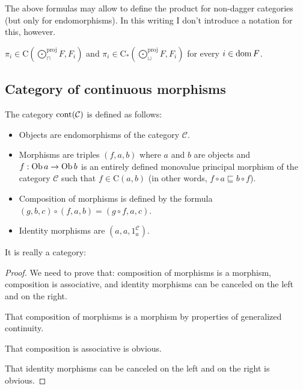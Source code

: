 \begin{rem}
  The above formulas may allow to define the product for non-dagger categories
  (but only for endomorphisms). In this writing I don't introduce a notation
  for this, however.
\end{rem}

\begin{cor}
  $\pi_i \in \mathrm{C} \left( \bigodot^{\text{proj}}_{\sqcap} F , F_i \right)$ and
  $\pi_i \in \mathrm{C}_{\ast} \left( \bigodot^{\text{proj}}_{\sqcup} F , F_i \right)$
  for every $i \in \operatorname{dom} F$.
\end{cor}

\subsection{Category of continuous morphisms}

\begin{defn}
  The category $\operatorname{cont} (\mathcal{C})$ is defined as follows:
  \begin{itemize}
    \item Objects are endomorphisms of the category $\mathcal{C}$.
    
    \item Morphisms are triples $(f , a , b)$ where $a$ and $b$ are objects
    and $f : \operatorname{Ob} a \rightarrow \operatorname{Ob} b$ is an entirely defined
    monovalue principal morphism of the category $\mathcal{C}$ such that $f
    \in \mathrm{C} (a , b)$ (in other words, $f \circ a \sqsubseteq b \circ
    f$).
    
    \item Composition of morphisms is defined by the formula $(g , b , c)
    \circ (f , a , b) = (g \circ f , a , c)$.
    
    \item Identity morphisms are $(a , a , 1^{\mathcal{C}}_a)$.
  \end{itemize}
\end{defn}

It is really a category:

\begin{proof}
  We need to prove that: composition of morphisms is a morphism, composition
  is associative, and identity morphisms can be canceled on the left and on
  the right.
  
  That composition of morphisms is a morphism by properties of generalized
  continuity.
  
  That composition is associative is obvious.
  
  That identity morphisms can be canceled on the left and on the right is
  obvious.
\end{proof}

